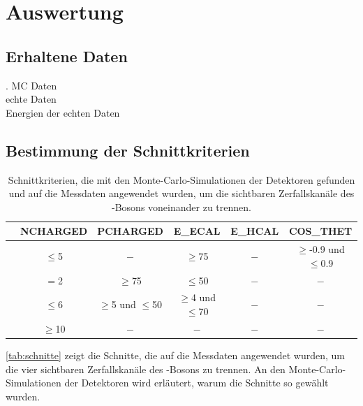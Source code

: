\section{Auswertung}
\subsection{Erhaltene Daten}.
MC Daten \\
echte Daten \\
Energien der echten Daten


\subsection{Bestimmung der Schnittkriterien}

\begin{table}[H]
    \caption{Schnittkriterien, die mit den Monte-Carlo-Simulationen der Detektoren gefunden und
    auf die Messdaten angewendet wurden, um die sichtbaren Zerfallskanäle des \Z-Bosons voneinander zu trennen.}
    \begin{center}
        \begin{tabular}{|c||c|c|c|c|c|}
            \hline
        	& NCHARGED	& PCHARGED				& E\_ECAL				& E\_HCAL	& COS\_THET						\\ \hline\hline
   \Zee		& $\leq$5	& $-$					& $\geq$75				& $-$		& $\geq$-0.9 und $\leq$0.9		\\ \hline
   \Zmm		& $=$2		& $\geq$75				& $\leq$50				& $-$		& $-$							\\ \hline
   \Ztt		& $\leq$6	& $\geq$5 und $\leq$50	& $\geq$4 und $\leq$70	& $-$		& $-$							\\ \hline
   \Zqq		& $\geq$10	& $-$					& $-$					& $-$		& $-$							\\ \hline

        \end{tabular}
    \end{center}
    \label{tab:schnitte}
\end{table}

\autoref{tab:schnitte} zeigt die Schnitte,
die auf die Messdaten angewendet wurden,
um die vier sichtbaren Zerfallskanäle des \Z-Bosons zu trennen.
An den Monte-Carlo-Simulationen der Detektoren wird erläutert, warum die Schnitte so gewählt wurden.

